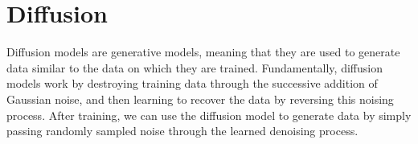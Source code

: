 
\chapter{Diffusion}
\label{cha:diffusion}

Diffusion models are generative models, meaning that they are used to generate data similar to the data on which they are trained.
Fundamentally, diffusion models work by destroying training data through the successive addition of Gaussian noise, and then learning to recover the data by reversing this noising process.
After training, we can use the diffusion model to generate data by simply passing randomly sampled noise through the learned denoising process.




